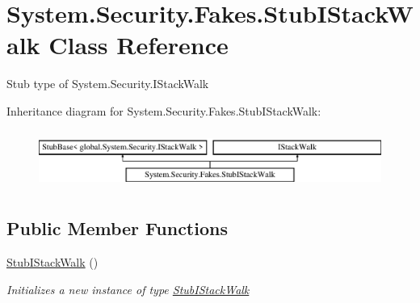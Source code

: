 \hypertarget{class_system_1_1_security_1_1_fakes_1_1_stub_i_stack_walk}{\section{System.\-Security.\-Fakes.\-Stub\-I\-Stack\-Walk Class Reference}
\label{class_system_1_1_security_1_1_fakes_1_1_stub_i_stack_walk}
}


Stub type of System.\-Security.\-I\-Stack\-Walk 


Inheritance diagram for System.\-Security.\-Fakes.\-Stub\-I\-Stack\-Walk\-:\begin{figure}[H]
\begin{center}
\leavevmode
\includegraphics[height=1.924399cm]{class_system_1_1_security_1_1_fakes_1_1_stub_i_stack_walk}
\end{center}
\end{figure}
\subsection*{Public Member Functions}
\begin{DoxyCompactItemize}
\item 
\hyperlink{class_system_1_1_security_1_1_fakes_1_1_stub_i_stack_walk_a6578abaef2261173dbd0457b053f89c5}{Stub\-I\-Stack\-Walk} ()
\begin{DoxyCompactList}\small\item\em Initializes a new instance of type \hyperlink{class_system_1_1_security_1_1_fakes_1_1_stub_i_stack_walk}{Stub\-I\-Stack\-Walk}\end{DoxyCompactList}\end{DoxyCompactItemize}
